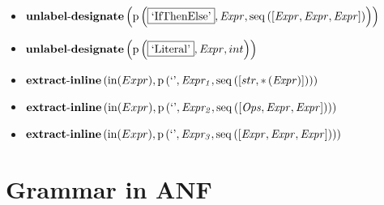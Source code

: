 {\begin{itemize}
\item $\mathbf{unlabel\text{-}designate}\\\left(\mathrm{p}\left(\fbox{\text{`IfThenElse'}},\mathit{Expr},\mathrm{seq}\left(\left[\mathit{Expr}, \mathit{Expr}, \mathit{Expr}\right]\right)\right)\right)$
\item $\mathbf{unlabel\text{-}designate}\\\left(\mathrm{p}\left(\fbox{\text{`Literal'}},\mathit{Expr},int\right)\right)$
\item $\mathbf{extract\text{-}inline}\left(\mathrm{in}(Expr),\\\mathrm{p}\left(\text{`'},\mathit{Expr_1},\mathrm{seq}\left(\left[str, {*}\left(\mathit{Expr}\right)\right]\right)\right)\right)$
\item $\mathbf{extract\text{-}inline}\left(\mathrm{in}(Expr),\\\mathrm{p}\left(\text{`'},\mathit{Expr_2},\mathrm{seq}\left(\left[\mathit{Ops}, \mathit{Expr}, \mathit{Expr}\right]\right)\right)\right)$
\item $\mathbf{extract\text{-}inline}\left(\mathrm{in}(Expr),\\\mathrm{p}\left(\text{`'},\mathit{Expr_3},\mathrm{seq}\left(\left[\mathit{Expr}, \mathit{Expr}, \mathit{Expr}\right]\right)\right)\right)$
\end{itemize}}

\section{Grammar in ANF}

